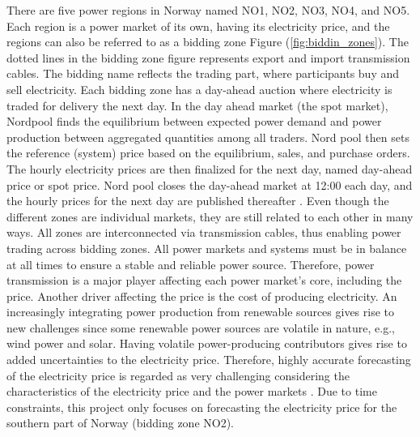 \documentclass
[twocolumn,
secnumarabic,
nobibnotes,
aps,
prl,
reprint,
groupedaddress,
amsmath,
amssymb,
]{revtex4-2}
\begin{document}
There are five power regions in Norway named NO1, NO2, NO3, NO4, and NO5. Each region is a power market of its own, having its electricity price, and the regions can also be referred to as a bidding zone Figure (\ref{fig:biddin_zones}). The dotted lines in the bidding zone figure represents export and import transmission cables. The bidding name reflects the trading part, where participants buy and sell electricity. Each bidding zone has a day-ahead auction where electricity is traded for delivery the next day. In the day ahead market (the spot market), Nordpool finds the equilibrium between expected power demand and power production between aggregated quantities among all traders. Nord pool then sets the reference (system) price based on the equilibrium, sales, and purchase orders. The hourly electricity prices are then finalized for the next day, named day-ahead price or spot price. Nord pool closes the day-ahead market at 12:00 each day, and the hourly prices for the next day are published thereafter \cite{nordpool}. Even though the different zones are individual markets, they are still related to each other in many ways. All zones are interconnected via transmission cables, thus enabling power trading across bidding zones. All power markets and systems must be in balance at all times to ensure a stable and reliable power source. Therefore, power transmission is a major player affecting each power market's core, including the price. Another driver affecting the price is the cost of producing electricity. An increasingly integrating power production from renewable sources gives rise to new challenges since some renewable power sources are volatile in nature, e.g., wind power and solar. Having volatile power-producing contributors gives rise to added uncertainties to the electricity price. Therefore, highly accurate forecasting of the electricity price is regarded as very challenging considering the characteristics of the electricity price and the power markets \cite{li_day-ahead_2021, nogales_forecasting_2002,bunn_forecasting_2000}. Due to time constraints, this project only focuses on forecasting the electricity price for the southern part of Norway (bidding zone NO2). 
\end{document}

